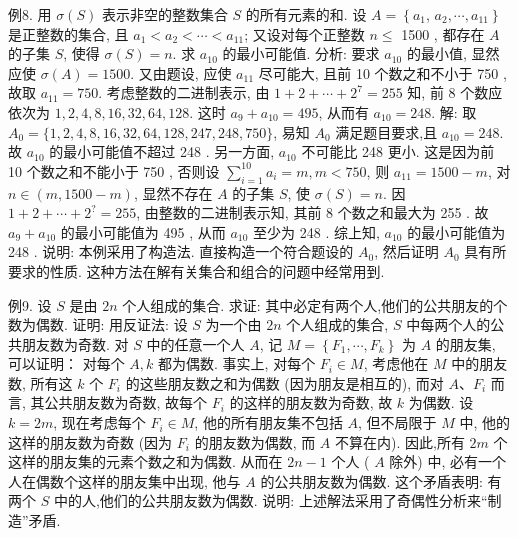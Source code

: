 例8. 用 $\sigma(S)$ 表示非空的整数集合 $S$ 的所有元素的和.
设 $A=\left\{a_1\right.$, $\left.a_2, \cdots, a_{11}\right\}$ 是正整数的集合, 且 $a_1<a_2<\cdots<a_{11}$; 又设对每个正整数 $n \leqslant$ 1500 , 都存在 $A$ 的子集 $S$, 使得 $\sigma(S)=n$. 求 $a_{10}$ 的最小可能值.
分析: 要求 $a_{10}$ 的最小值, 显然应使 $\sigma(A)=1500$. 又由题设, 应使 $a_{11}$ 尽可能大, 且前 10 个数之和不小于 750 , 故取 $a_{11}=750$. 考虑整数的二进制表示, 由 $1+2+\cdots+2^7=255$ 知, 前 8 个数应依次为 $1,2,4,8,16,32,64,128$. 这时 $a_9+a_{10}=495$, 从而有 $a_{10}=248$.
解: 取 $A_0=\{1,2,4,8,16,32,64,128,247,248,750\}$, 易知 $A_0$ 满足题目要求,且 $a_{10}=248$. 故 $a_{10}$ 的最小可能值不超过 248 .
另一方面, $a_{10}$ 不可能比 248 更小.
这是因为前 10 个数之和不能小于 750 , 否则设 $\sum_{i=1}^{10} a_i=m, m<750$, 则 $a_{11}=1500-m$, 对 $n \in(m, 1500-m)$, 显然不存在 $A$ 的子集 $S$, 使 $\sigma(S)=n$. 因 $1+2+\cdots+2^?=255$, 由整数的二进制表示知, 其前 8 个数之和最大为 255 . 故 $a_9+a_{10}$ 的最小可能值为 495 , 从而 $a_{10}$ 至少为 248 .
综上知, $a_{10}$ 的最小可能值为 248 .
说明: 本例采用了构造法.
直接构造一个符合题设的 $A_0$, 然后证明 $A_0$ 具有所要求的性质.
这种方法在解有关集合和组合的问题中经常用到.



例9. 设 $S$ 是由 $2 n$ 个人组成的集合.
求证: 其中必定有两个人,他们的公共朋友的个数为偶数.
证明: 用反证法: 设 $S$ 为一个由 $2 n$ 个人组成的集合, $S$ 中每两个人的公共朋友数为奇数.
对 $S$ 中的任意一个人 $A$, 记 $M=\left\{F_1, \cdots, F_k\right\}$ 为 $A$ 的朋友集, 可以证明： 对每个 $A, k$ 都为偶数.
事实上, 对每个 $F_i \in M$, 考虑他在 $M$ 中的朋友数, 所有这 $k$ 个 $F_i$ 的这些朋友数之和为偶数 (因为朋友是相互的), 而对 $A 、 F_i$ 而言, 其公共朋友数为奇数, 故每个 $F_i$ 的这样的朋友数为奇数, 故 $k$ 为偶数.
设 $k=2 m$, 现在考虑每个 $F_i \in M$, 他的所有朋友集不包括 $A$, 但不局限于 $M$ 中, 他的这样的朋友数为奇数 (因为 $F_i$ 的朋友数为偶数, 而 $A$ 不算在内). 因此,所有 $2 m$ 个这样的朋友集的元素个数之和为偶数.
从而在 $2 n-1$ 个人 ( $A$ 除外) 中, 必有一个人在偶数个这样的朋友集中出现, 他与 $A$ 的公共朋友数为偶数.
这个矛盾表明: 有两个 $S$ 中的人,他们的公共朋友数为偶数.
说明: 上述解法采用了奇偶性分析来“制造”矛盾.



